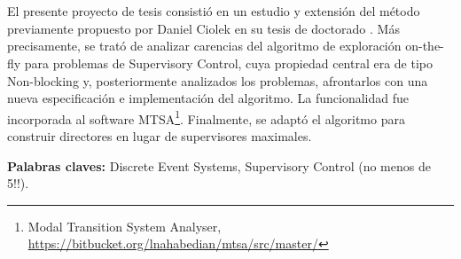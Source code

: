 \chapter*{\runtitulo}

\noindent 
El presente proyecto de tesis consistió en un estudio y extensión del método previamente propuesto por Daniel Ciolek en su tesis de doctorado \cite{tesisDani}. Más precisamente, se trató de analizar carencias del algoritmo de exploración on-the-fly para problemas de Supervisory Control, cuya propiedad central era de tipo Non-blocking y, posteriormente analizados los problemas, afrontarlos con una nueva especificación e implementación del algoritmo. La funcionalidad fue incorporada al software MTSA\footnote{Modal Transition System Analyser, \href{https://bitbucket.org/lnahabedian/mtsa/src/master/^}{https://bitbucket.org/lnahabedian/mtsa/src/master/}}. Finalmente, se adaptó el algoritmo para construir directores en lugar de supervisores maximales.

\bigskip

\noindent\textbf{Palabras claves:} Discrete Event Systems, Supervisory Control (no menos de 5!!).
